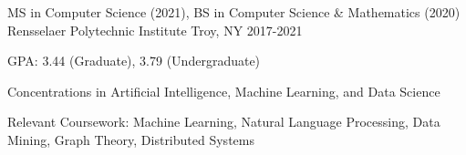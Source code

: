 


\begin{cventries}

  \cventry
  {MS in Computer Science (2021), BS in Computer Science \& Mathematics (2020)}
	{Rensselaer Polytechnic Institute}
	{Troy, NY}
	{2017-2021}
  {
    \begin{cvitems}
      \item GPA: 3.44 (Graduate), 3.79 (Undergraduate)
      \item Concentrations in Artificial Intelligence, Machine Learning, and Data Science
      \item Relevant Coursework: Machine Learning, Natural Language Processing, Data Mining, Graph Theory, Distributed Systems
    \end{cvitems}
  }


\end{cventries}